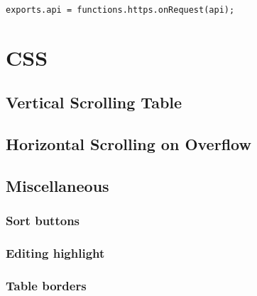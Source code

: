 \documentclass[letterpaper]{article}
\begin{document}
\begin{lstlisting}[firstnumber=67]
exports.api = functions.https.onRequest(api);
\end{lstlisting}

\newpage

\section{CSS}\label{CSS}

\subsection{Vertical Scrolling Table}
\subsection{Horizontal Scrolling on Overflow}\label{overflow-x}
\subsection{Miscellaneous}
\subsubsection{Sort buttons}
\subsubsection{Editing highlight}
\subsubsection{Table borders}
\end{document}
